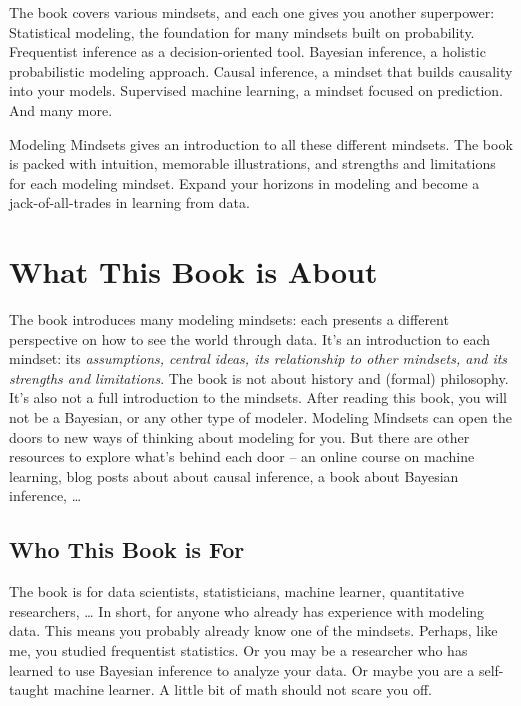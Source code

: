 \documentclass[
  10pt,
]{scrbook}
\begin{document}
The book covers various mindsets, and each one gives you another superpower:
Statistical modeling, the foundation for many mindsets built on probability.
Frequentist inference as a decision-oriented tool.
Bayesian inference, a holistic probabilistic modeling approach.
Causal inference, a mindset that builds causality into your models.
Supervised machine learning, a mindset focused on prediction.
And many more.

Modeling Mindsets gives an introduction to all these different mindsets.
The book is packed with intuition, memorable illustrations, and strengths and limitations for each modeling mindset.
Expand your horizons in modeling and become a jack-of-all-trades in learning from data.

\hypertarget{what-this-book-is-about}{%
\chapter{What This Book is About}\label{what-this-book-is-about}}

The book introduces many modeling mindsets: each presents a different perspective on how to see the world through data.
It's an introduction to each mindset: its \emph{assumptions, central ideas, its relationship to other mindsets, and its strengths and limitations}.
The book is not about history and (formal) philosophy.
It's also not a full introduction to the mindsets.
After reading this book, you will not be a Bayesian, or any other type of modeler.
Modeling Mindsets can open the doors to new ways of thinking about modeling for you.
But there are other resources to explore what's behind each door -- an online course on machine learning, blog posts about about causal inference, a book about Bayesian inference, \ldots{}

\hypertarget{who-this-book-is-for}{%
\section{Who This Book is For}\label{who-this-book-is-for}}

The book is for data scientists, statisticians, machine learner, quantitative researchers, \ldots{}
In short, for anyone who already has experience with modeling data.
This means you probably already know one of the mindsets.
Perhaps, like me, you studied frequentist statistics.
Or you may be a researcher who has learned to use Bayesian inference to analyze your data.
Or maybe you are a self-taught machine learner.
A little bit of math should not scare you off.
\end{document}
